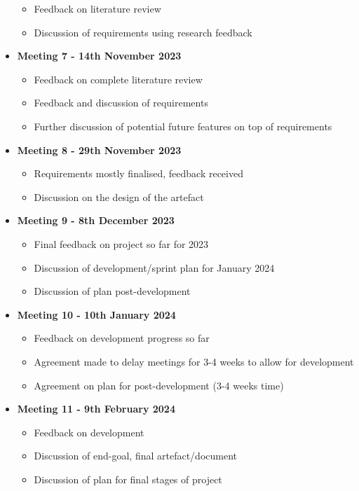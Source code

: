 \begin{itemize}
\begin{itemize}
        \item Feedback on literature review
        \item Discussion of requirements using research feedback
    \end{itemize}
    \item \textbf{Meeting 7 - 14th November 2023}
    \begin{itemize}
        \item Feedback on complete literature review
        \item Feedback and discussion of requirements
        \item Further discussion of potential future features on top of requirements
    \end{itemize}
    \item \textbf{Meeting 8 - 29th November 2023}
    \begin{itemize}
        \item Requirements mostly finalised, feedback received
        \item Discussion on the design of the artefact
    \end{itemize}
    \item \textbf{Meeting 9 - 8th December 2023}
    \begin{itemize}
        \item Final feedback on project so far for 2023
        \item Discussion of development/sprint plan for January 2024
        \item Discussion of plan post-development
    \end{itemize}
    \item \textbf{Meeting 10 - 10th January 2024}
    \begin{itemize}
        \item Feedback on development progress so far
        \item Agreement made to delay meetings for 3-4 weeks to allow for development
        \item Agreement on plan for post-development (3-4 weeks time)
    \end{itemize}
    \item \textbf{Meeting 11 - 9th February 2024}
    \begin{itemize}
        \item Feedback on development
        \item Discussion of end-goal, final artefact/document
        \item Discussion of plan for final stages of project

\end{itemize}
\end{itemize}

